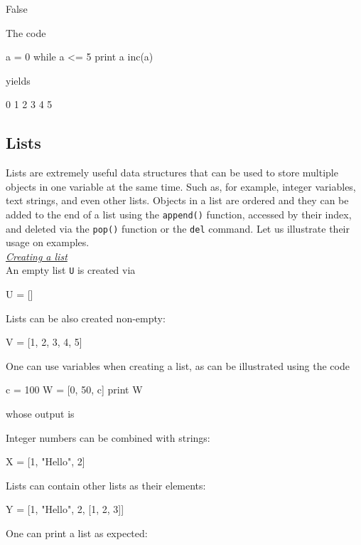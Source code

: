 \begin{greencode}
False
\end{greencode}
The code 

\begin{bluecode}
a = 0
while a <= 5
  print a 
  inc(a)
\end{bluecode}
yields 

\begin{greencode}
0
1
2
3
4
5
\end{greencode}

\subsection{Lists}

Lists are extremely useful data structures that can be used to store multiple 
objects in one variable at the same time. 
Such as, for example, integer variables, text strings, and even other lists.
Objects in a list are ordered and they can be added to the end of a list 
using the {\tt append()} function, accessed by their index, and 
deleted via the {\tt pop()} function or the {\tt del} command. Let us 
illustrate their usage on examples.\\

\noindent
\underline{\em Creating a list}\\

An empty list {\tt U} is created via 

\begin{bluecode}
U = []
\end{bluecode}
Lists can be also created non-empty:

\begin{bluecode}
V = [1, 2, 3, 4, 5]
\end{bluecode}
One can use variables when creating a list, as can be 
illustrated using the code

\begin{bluecode}
c = 100
W = [0, 50, c]
print W
\end{bluecode}
whose output is 

\begin{greencode}
[0, 50, 100]
\end{greencode}
Integer numbers can be combined with strings:

\begin{bluecode}
X = [1, "Hello", 2]
\end{bluecode}
Lists can contain other lists as their elements:

\begin{bluecode}
Y = [1, "Hello", 2, [1, 2, 3]]
\end{bluecode}
One can print a list as expected:

